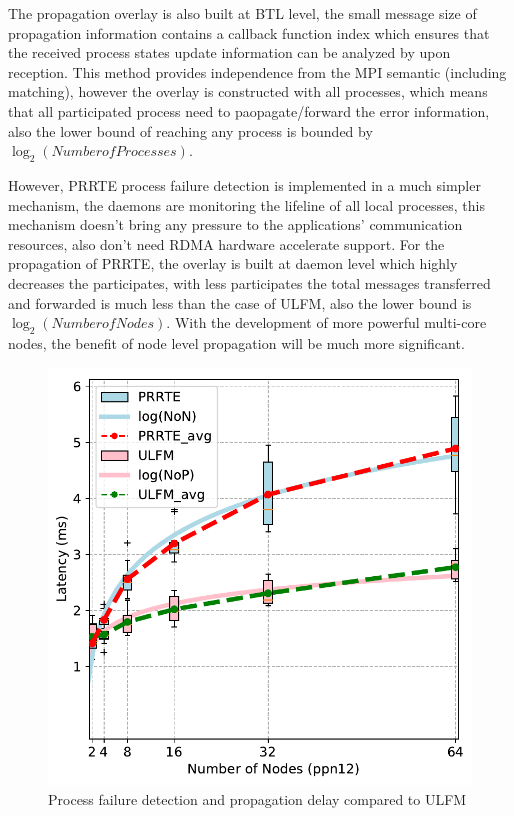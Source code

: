 \documentclass[sigconf]{acmart}
\begin{document}
The propagation overlay is also built at BTL level, the small message size of propagation information contains a callback function index which ensures that the received process states update information can be analyzed by upon reception. This method provides independence from the MPI semantic (including matching), however the overlay is constructed with all processes, which means that all participated process need to paopagate/forward the error information, also the lower bound of reaching any process is bounded by $\log_2(Number of Processes)$.  

However, PRRTE process failure detection is implemented in a much simpler mechanism, the daemons are monitoring the lifeline of all local processes, this mechanism doesn't bring any pressure to the applications' communication resources, also don't need RDMA hardware accelerate support. For the propagation of PRRTE, the overlay is built at daemon level which highly decreases the participates, with less participates the total messages transferred and forwarded is much less than the case of ULFM, also the lower bound is $\log_2({Number of Nodes})$. With the development of more powerful multi-core nodes, the benefit of node level propagation will be much more significant.

\begin{figure}[h]
  \centering
  \includegraphics[width=\linewidth]{Process_Failure_log_fit.pdf}
  \caption{Process failure detection and propagation delay compared to ULFM}
\end{figure}
\end{document}
